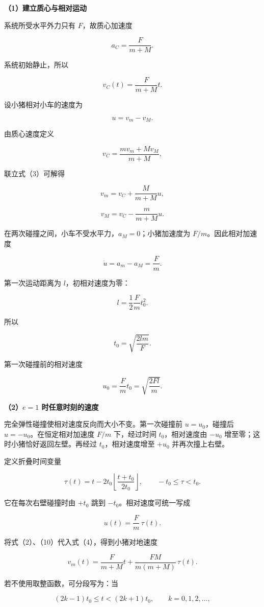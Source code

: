 \documentclass[12pt,a4paper,UTF8]{ctexart}
\begin{document}
\textbf{（1）建立质心与相对运动}

系统所受水平外力只有 \(F\)，故质心加速度

\[
a_C=\frac{F}{m+M}.
\tag{1}
\]

系统初始静止，所以

\[
v_C(t)=\frac{F}{m+M}t.
\tag{2}
\]

设小猪相对小车的速度为

\[
u=v_m-v_M.
\tag{3}
\]

由质心速度定义

\[
v_C=\frac{mv_m+Mv_M}{m+M},
\]

联立式（3）可解得

\[
v_m=v_C+\frac{M}{m+M}u,
\tag{4}
\]

\[
v_M=v_C-\frac{m}{m+M}u.
\tag{5}
\]

在两次碰撞之间，小车不受水平力，\(a_M=0\)；小猪加速度为
\(F/m\)。因此相对加速度

\[
\dot u=a_m-a_M=\frac Fm.
\tag{6}
\]

第一次运动距离为 \(l\)，初相对速度为零：

\[
l=\frac12\frac Fm t_0^2.
\]

所以

\[
\boxed{t_0=\sqrt{\frac{2lm}{F}}}.
\tag{7}
\]

第一次碰撞前的相对速度

\[
u_0=\frac Fm t_0
=\sqrt{\frac{2Fl}{m}}.
\tag{8}
\]

\textbf{（2）\(e=1\) 时任意时刻的速度}

完全弹性碰撞使相对速度反向而大小不变。第一次碰撞前 \(u=u_0\)，碰撞后
\(u=-u_0\)。在恒定相对加速度 \(F/m\) 下，经过时间 \(t_0\)，相对速度由
\(-u_0\) 增至零；这时小猪恰好返回左壁。再经过 \(t_0\)，相对速度增至
\(+u_0\) 并再次撞上右壁。

定义折叠时间变量

\[
\tau(t)
=t-2t_0\left\lfloor\frac{t+t_0}{2t_0}\right\rfloor,
\qquad
-t_0\leq\tau<t_0.
\tag{9}
\]

它在每次右壁碰撞时由 \(+t_0\) 跳到 \(-t_0\)。相对速度可统一写成

\[
u(t)=\frac Fm\,\tau(t).
\tag{10}
\]

将式（2）、（10）代入式（4），得到小猪对地速度

\[
\boxed{
v_m(t)
=\frac{F}{m+M}t
+\frac{FM}{m(m+M)}\,
\tau(t)
}.
\tag{11}
\]

若不使用取整函数，可分段写为：当

\[
(2k-1)t_0\leq t<(2k+1)t_0,
\qquad k=0,1,2,\ldots,
\]
\end{document}
